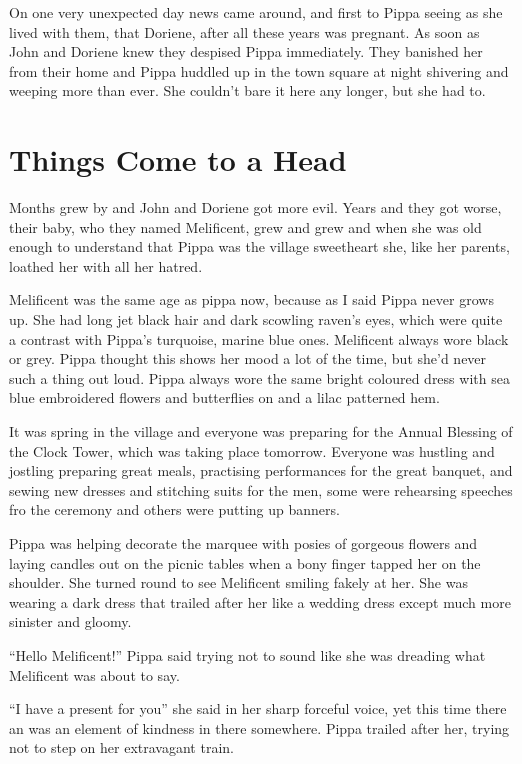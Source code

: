 On one very unexpected day news came around, and first to Pippa seeing
as she lived with them, that Doriene, after all these years was
pregnant. As soon as John and Doriene knew they despised Pippa
immediately. They banished her from their home and Pippa huddled up in
the town square at night shivering and weeping more than ever. She
couldn't bare it here any longer, but she had to.

\chapter{Things Come to a Head}

Months grew by and John and Doriene got more evil. Years and they got
worse, their baby, who they named Melificent, grew and grew and when she
was old enough to understand that Pippa was the village sweetheart she,
like her parents, loathed her with all her hatred.

Melificent was the same age as pippa now, because as I said Pippa never
grows up. She had long jet black hair and dark scowling raven's eyes,
which were quite a contrast with Pippa's turquoise, marine blue ones.
Melificent always wore black or grey. Pippa thought this shows her mood
a lot of the time, but she'd never such a thing out loud. Pippa always
wore the same bright coloured dress with sea blue embroidered flowers
and butterflies on and a lilac patterned hem.

It was spring in the village and everyone was preparing for the Annual
Blessing of the Clock Tower, which was taking place tomorrow. Everyone
was hustling and jostling preparing great meals, practising performances
for the great banquet, and sewing new dresses and stitching suits for
the men, some were rehearsing speeches fro the ceremony and others were
putting up banners.

Pippa was helping decorate the marquee with posies of gorgeous flowers
and laying candles out on the picnic tables when a bony finger tapped
her on the shoulder. She turned round to see Melificent smiling fakely
at her. She was wearing a dark dress that trailed after her like a
wedding dress except much more sinister and gloomy.

``Hello Melificent!'' Pippa said trying not to sound like she was
dreading what Melificent was about to say.

``I have a present for you'' she said in her sharp forceful voice, yet
this time there an was an element of kindness in there somewhere. Pippa
trailed after her, trying not to step on her extravagant train.

